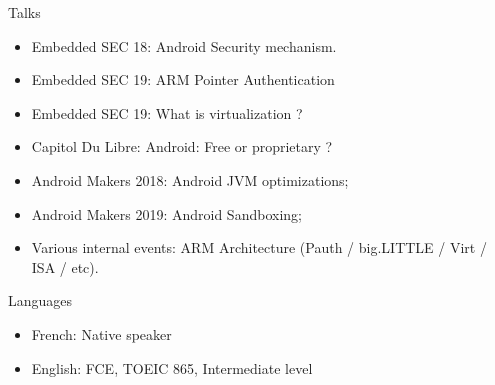 \documentclass[a4paper, 10pt]{article}
\begin{document}
\begin{section} {Talks}
    \begin{skills}
	\begin{itemize}[parsep=0cm,itemsep=0cm,topsep=0cm]
	    \item Embedded SEC 18: Android Security mechanism.
	    \item Embedded SEC 19: ARM Pointer Authentication
	    \item Embedded SEC 19: What is virtualization ?
	    \item Capitol Du Libre: Android: Free or proprietary ?
	    \item Android Makers 2018: Android JVM optimizations;
	    \item Android Makers 2019: Android Sandboxing;
	    \item Various internal events: ARM Architecture (Pauth / big.LITTLE / Virt / ISA / etc).
	\end{itemize}
    \end{skills}
\end{section}

\begin{section} {Languages}
    \begin{languages}
	\begin{itemize}[parsep=0cm,itemsep=0cm,topsep=0cm]
	    \item French: Native speaker
	    \item English: FCE, TOEIC 865, Intermediate level
	\end{itemize}
    \end{languages}
\end{section}
\end{document}
